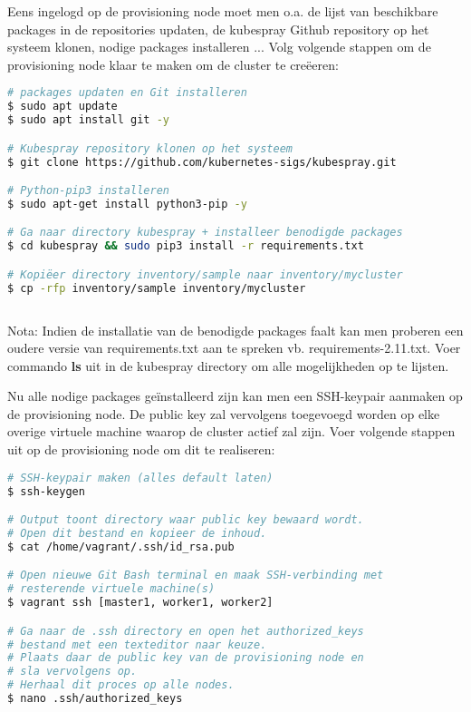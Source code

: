 Eens ingelogd op de provisioning node moet men o.a. de lijst van beschikbare packages in de repositories updaten, de kubespray Github repository op het systeem klonen, nodige packages installeren ... Volg volgende stappen om de provisioning node klaar te maken om de cluster te creëeren:

\begin{lstlisting}[language=bash]
# packages updaten en Git installeren
$ sudo apt update
$ sudo apt install git -y

# Kubespray repository klonen op het systeem
$ git clone https://github.com/kubernetes-sigs/kubespray.git

# Python-pip3 installeren
$ sudo apt-get install python3-pip -y

# Ga naar directory kubespray + installeer benodigde packages
$ cd kubespray && sudo pip3 install -r requirements.txt

# Kopiëer directory inventory/sample naar inventory/mycluster
$ cp -rfp inventory/sample inventory/mycluster   
 
\end{lstlisting}
 
Nota: Indien de installatie van de benodigde packages faalt kan men proberen een oudere versie van requirements.txt aan te spreken vb. requirements-2.11.txt. Voer commando {\bf ls} uit in de kubespray directory om alle mogelijkheden op te lijsten.

Nu alle nodige packages geïnstalleerd zijn kan men een SSH-keypair aanmaken op de provisioning node. De public key zal vervolgens toegevoegd worden op elke overige virtuele machine waarop de cluster actief zal zijn. Voer volgende stappen uit op de provisioning node om dit te realiseren:

\begin{lstlisting}[language=bash]
# SSH-keypair maken (alles default laten)
$ ssh-keygen

# Output toont directory waar public key bewaard wordt.
# Open dit bestand en kopieer de inhoud.
$ cat /home/vagrant/.ssh/id_rsa.pub

# Open nieuwe Git Bash terminal en maak SSH-verbinding met 
# resterende virtuele machine(s)
$ vagrant ssh [master1, worker1, worker2]

# Ga naar de .ssh directory en open het authorized_keys 
# bestand met een texteditor naar keuze. 
# Plaats daar de public key van de provisioning node en 
# sla vervolgens op.
# Herhaal dit proces op alle nodes.
$ nano .ssh/authorized_keys
    
\end{lstlisting} 

